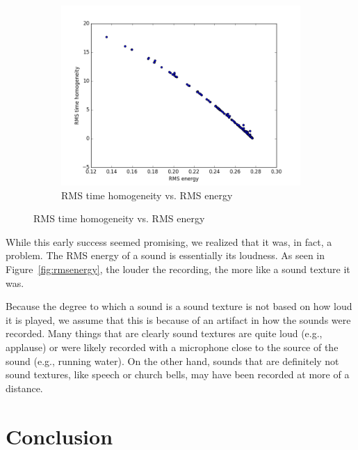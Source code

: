 \documentclass{sig-alternate-05-2015}
\begin{document}
\begin{figure}[hbt!]
        \begin{subfigure}[b]{0.45\textwidth}
      \centering
      \includegraphics[width=\textwidth]{figures/rms_homogeneity_vs_energy.png}
      \caption{RMS time homogeneity vs. RMS energy}
      \label{fig:homogvsenergy}
    \end{subfigure}
    \end{figure}

    While this early success seemed promising, we realized that it was, in fact, a problem. The RMS energy of a sound is essentially its loudness. As seen in Figure~\ref{fig:rmsenergy}, the louder the recording, the more like a sound texture it was.

    Because the degree to  which a sound is a sound texture is not based on how loud it is played, we assume that this is because of an artifact in how the sounds were recorded. Many things  that are clearly sound textures are quite loud (e.g.,  applause) or were likely recorded with a microphone close to the source of the sound (e.g., running water). On the other hand, sounds that are definitely not sound textures, like speech or church  bells, may have been recorded at more of a distance.

\section{Conclusion}
\end{document}

